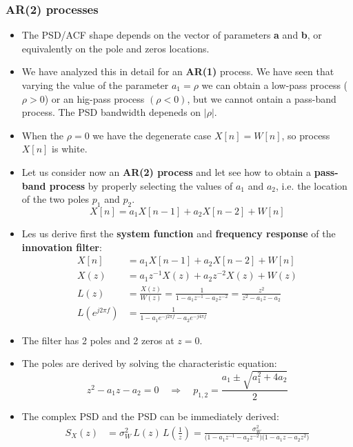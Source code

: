 \subsubsection{AR(2) processes}
\begin{itemize}
    \item The PSD/ACF shape depends on the vector of parameters \textbf{a} and \textbf{b}, or equivalently on the pole and zeros locations.
    \item We have analyzed this in detail for an \textbf{AR(1)} process. We have seen that varying the value of the parameter \(a_1=\rho\) we can obtain a low-pass process (\(\rho>0\)) or an hig-pass process \((\rho<0)\), but we cannot ontain a pass-band process. The PSD bandwidth depeneds on \(|\rho|\).
    \item When the \(\rho=0\) we have the degenerate case \(X[n]=W[n]\), so process \(X[n]\) is white.
    \item Let us consider now an \textbf{AR(2) process} and let see how to obtain a \textbf{pass-band process} by properly selecting the values of \(a_1\) and \(a_2\), i.e. the location of the two poles \(p_1\) and \(p_2\).
    \[
    X[n]=a_1X[n-1]+a_2X[n-2]+W[n]
    \]
    \item Les us derive first the \textbf{system function} and \textbf{frequency response} of the \textbf{innovation filter}:
    \begin{align*}
X[n] &= a_{1} X[n-1] + a_{2} X[n-2] + W[n] \\[6pt]
X(z) &= a_{1} z^{-1} X(z) + a_{2} z^{-2} X(z) + W(z) \\[6pt]
L(z) &= \frac{X(z)}{W(z)}
     = \frac{1}{1 - a_{1} z^{-1} - a_{2} z^{-2}}
     = \frac{z^{2}}{z^{2} - a_{1} z - a_{2}} \\[6pt]
L\!\left(e^{j2\pi f}\right)
     &= \frac{1}{1 - a_{1} e^{-j2\pi f} - a_{2} e^{-j4\pi f}}
\end{align*}
\item The filter has 2 poles and 2 zeros at \(z=0\).
\item The poles are derived by solving the characteristic equation:
\[
z^2-a_1z-a_2=0\quad\Longrightarrow\quad p_{1,2}=\frac{a_1\pm\sqrt{a_1^2+4a_2}}{2}
\]
\item The complex PSD and the PSD can be immediately derived:
\begin{align*}
S_{X}(z)
  &= \sigma_{W}^{2}\,L(z)\,L\!\left(\frac{1}{z}\right) = \frac{\sigma_{W}^{2}}
          {\bigl(1-a_{1}z^{-1}-a_{2}z^{-2}\bigr)
           \bigl(1-a_{1}z-a_{2}z^{2}\bigr)} \\[6pt]

\end{align*}
\end{itemize}
